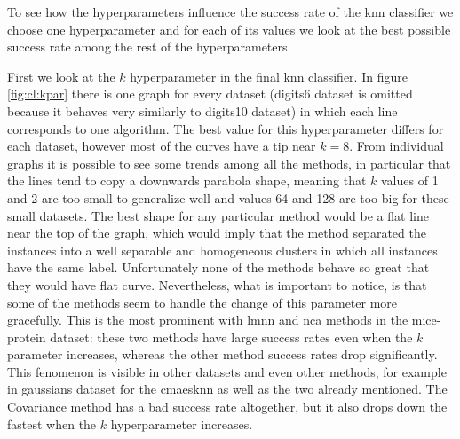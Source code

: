 \documentclass[12pt,a4paper]{report}
\begin{document}


To see how the hyperparameters influence the success rate of the \ac{knn} classifier we choose one hyperparameter and for each of its values we look at the best possible success rate among the rest of the hyperparameters.

First we look at the $k$ hyperparameter in the final \ac{knn} classifier. In figure \ref{fig:cl:kpar} there is one graph for every dataset (digits6 dataset is omitted because it behaves very similarly to digits10 dataset) in which each line corresponds to one algorithm. The best value for this hyperparameter differs for each dataset, however most of the curves have a tip near $k=8$. From individual graphs it is possible to see some trends among all the methods, in particular that the lines tend to copy a downwards parabola shape, meaning that $k$ values of 1 and 2 are too small to generalize well and values 64 and 128 are too big for these small datasets. The best shape for any particular method would be a flat line near the top of the graph, which would imply that the method separated the instances into a well separable and homogeneous clusters in which all instances have the same label. Unfortunately none of the methods behave so great that they would have flat curve. Nevertheless, what is important to notice, is that some of the methods seem to handle the change of this parameter more gracefully. This is the most prominent with \ac{lmnn} and \ac{nca} methods in the mice-protein dataset: these two methods have large success rates even when the $k$ parameter increases, whereas the other method success rates drop significantly. This fenomenon is visible in other datasets and even other methods, for example in gaussians dataset for the \ac{cmaesknn} as well as the two already mentioned. The Covariance method has a bad success rate altogether, but it also drops down the fastest when the $k$ hyperparameter increases.

\end{document}
